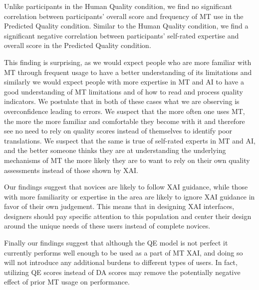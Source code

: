 Unlike participants in the Human Quality condition, we find no significant correlation between participants' overall score and frequency of MT use in the Predicted Quality condition. Similar to the Human Quality condition, we find a significant negative correlation between participants' self-rated expertise and overall score in the Predicted Quality condition.  

This finding is surprising, as we would expect people who are more familiar with MT through frequent usage to have a better understanding of its limitations and similarly we would expect people with more expertise in MT and AI to have a good understanding of MT limitations and of how to read and process quality indicators. We postulate that in both of these cases what we are observing is overconfidence leading to errors. We suspect that the more often one uses MT, the more the more familiar and comfortable they become with it and therefore see no need to rely on quality scores instead of themselves to identify poor translations. We suspect that the same is true of self-rated experts in MT and AI, and the better someone thinks they are at understanding the underlying mechanisms of MT the more likely they are to want to rely on their own quality assessments instead of those shown by XAI.

Our findings suggest that novices are likely to follow XAI guidance, while those with more familiarity or expertise in the area are likely to ignore XAI guidance in favor of their own judgement. This means that in designing XAI interfaces, designers should pay specific attention to this population and center their design around the unique needs of these users instead of complete novices. 

Finally our findings suggest that although the QE model is not perfect it currently performs well enough to be used as a part of MT XAI, and doing so will not introduce any additional burdens to different types of users. In fact, utilizing QE scores instead of DA scores may remove the potentially negative effect of prior MT usage on performance.  


